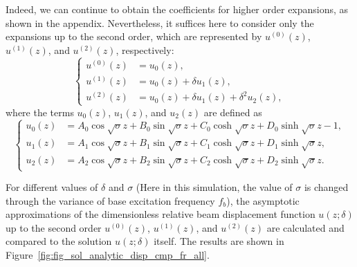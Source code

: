 \documentclass{article}
\begin{document}
Indeed, we can continue to obtain the coefficients for higher order expansions, as shown in the appendix. Nevertheless, it suffices here to consider only the expansions up to the second order, which are represented by $u^{(0)} (z)$, $u^{(1)} (z)$, and $u^{(2)} (z)$, respectively:
\begin{equation}
    \left\{\begin{aligned}
        u^{(0)} (z) &= u_0 (z), \\
        u^{(1)} (z) &= u_0 (z) + \delta u_1(z), \\
        u^{(2)} (z) &= u_0 (z) + \delta u_1(z) + \delta^2 u_2 (z),
    \end{aligned}\right.
\end{equation}
where the terms $u_0 (z)$, $u_1(z)$, and $u_2 (z)$ are defined as
\begin{equation}
    \left\{\begin{aligned}
        u_0 (z) &= A_0 \cos{\sqrt{\sigma}z} + B_0 \sin{\sqrt{\sigma}z} + C_0 \cosh{\sqrt{\sigma}z} + D_0 \sinh{\sqrt{\sigma}z} - 1, \\
        u_1 (z) &= A_1 \cos{\sqrt{\sigma}z} + B_1 \sin{\sqrt{\sigma}z} + C_1 \cosh{\sqrt{\sigma}z} + D_1 \sinh{\sqrt{\sigma}z}, \\
        u_2 (z) &= A_2 \cos{\sqrt{\sigma}z} + B_2 \sin{\sqrt{\sigma}z} + C_2 \cosh{\sqrt{\sigma}z} + D_2 \sinh{\sqrt{\sigma}z}.
    \end{aligned}\right.
\end{equation}

For different values of $\delta$ and $\sigma$ (Here in this simulation, the value of $\sigma$ is changed through the variance of base excitation frequency $f_b$), the asymptotic approximations of the dimensionless relative beam displacement function $u(z;\delta)$ up to the second order $u^{(0)}(z)$, $u^{(1)}(z)$, and $u^{(2)}(z)$ are calculated and compared to the solution $u(z;\delta)$ itself. The results are shown in Figure~\ref{fig:fig_sol_analytic_disp_cmp_fr_all}. 
\end{document}
